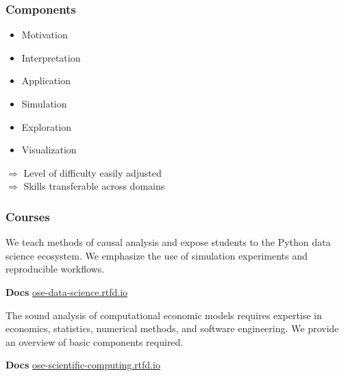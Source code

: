 \begin{frame}\frametitle{Components}

	\begin{multicols}{2}
	\vspace{0.3cm}
	\begin{itemize}\setlength\itemsep{1em}
	\item Motivation
	\item Interpretation
	\item Application
	\end{itemize}




  \vspace{0.3cm}
	\begin{itemize}\setlength\itemsep{1em}
	\item Simulation
	\item Exploration
	\item Visualization
	\end{itemize}
	\end{multicols}

	\pause


	\hspace{0.3cm}$\Rightarrow$  Level of difficulty easily adjusted\\\vspace{1em}
	\pause
	\hspace{0.3cm}$\Rightarrow$  Skills transferable across domains

\end{frame}
\begin{frame}\frametitle{Courses}


    We teach methods of causal analysis and expose students to the Python data science ecosystem. We emphasize the use of simulation experiments and reproducible workflows.

    \textbf{Docs}\hspace{0.25cm} \url{ose-data-science.rtfd.io}\vspace{0.5cm}


    The sound analysis of computational economic models requires expertise in economics, statistics, numerical methods, and software engineering. We provide an overview of basic components required.

    \textbf{Docs}\hspace{0.25cm} \url{ose-scientific-computing.rtfd.io}

\end{frame}
